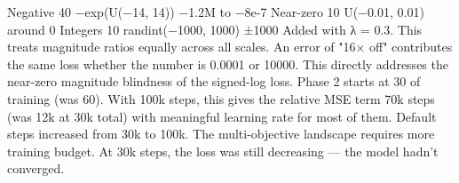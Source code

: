 {}\markdownRendererPipe{} Negative \markdownRendererPipe{} 40\markdownRendererPercentSign{} \markdownRendererPipe{} −exp(U(−14, 14)) \markdownRendererPipe{} \markdownRendererTilde{}−1.2M to \markdownRendererTilde{}−8e-7 \markdownRendererPipe{}\markdownRendererSoftLineBreak
{}\markdownRendererPipe{} Near-zero \markdownRendererPipe{} 10\markdownRendererPercentSign{} \markdownRendererPipe{} U(−0.01, 0.01) \markdownRendererPipe{} around 0 \markdownRendererPipe{}\markdownRendererSoftLineBreak
{}\markdownRendererPipe{} Integers \markdownRendererPipe{} 10\markdownRendererPercentSign{} \markdownRendererPipe{} randint(−1000, 1000) \markdownRendererPipe{} ±1000 \markdownRendererPipe{}\markdownRendererInterblockSeparator
{}
\markdownRendererSectionEnd \markdownRendererSectionBegin
{}\markdownRendererInterblockSeparator
{} Added  with λ = 0.3.\markdownRendererParagraphSeparator
{}This treats magnitude ratios equally across all scales. An error of "16× off" contributes the same loss whether the number is 0.0001 or 10000. This directly addresses the near-zero magnitude blindness of the signed-log loss.\markdownRendererParagraphSeparator
{} \markdownRendererInterblockSeparator
{}
\markdownRendererSectionEnd \markdownRendererSectionBegin
{}\markdownRendererInterblockSeparator
{} Phase 2 starts at 30\markdownRendererPercentSign{} of training (was 60\markdownRendererPercentSign{}).\markdownRendererParagraphSeparator
{}With 100k steps, this gives the relative MSE term 70k steps (was 12k at 30k total) with meaningful learning rate for most of them.\markdownRendererInterblockSeparator
{}
\markdownRendererSectionEnd \markdownRendererSectionBegin
{}\markdownRendererInterblockSeparator
{} Default steps increased from 30k to 100k.\markdownRendererParagraphSeparator
{}The multi-objective landscape requires more training budget. At 30k steps, the loss was still decreasing — the model hadn't converged.\markdownRendererInterblockSeparator
